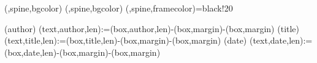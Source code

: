 (,spine,bgcolor){}{%
  (,spine,bgcolor){}{%
    (,spine,framecolor)={black!20}%
  }%
}%


(author){%
  \spine(text,author,len):={\dimexpr\thespine(box,author,len)-\thespine(box,margin)-\thespine(box,margin)}
}{}
(title){%
  \spine(text,title,len):={\dimexpr\thespine(box,title,len)-\thespine(box,margin)-\thespine(box,margin)}
}{}
(date){%
  \spine(text,date,len):={\dimexpr\thespine(box,date,len)-\thespine(box,margin)-\thespine(box,margin)}
}{}


\newcommand{\@spinetextalin}[1]{%
  \raggedright%
  \IfStrEqCase{\thespine(box,#1,align)}{%
    {l}{\raggedright}%
    {c}{\centering}%
    {r}{\raggedleft}%
  }%
}

\newcommand{\@spinetextcolor}[1]{%
  \ifdatadefinedor{\arg}{spine}({box,#1,textcolor},{box,textcolor}){%
    \color{\thespine(\arg)}%
  }{}%
}

